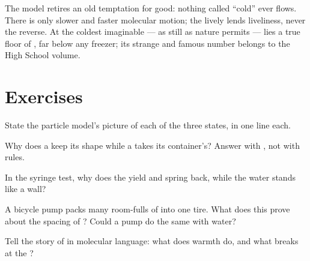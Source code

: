 \begin{example}\label{ex:g7:states-of-matter:cold}
The model retires an old temptation for good: nothing called
``cold'' ever flows. There is only slower and faster molecular
motion; the lively lends liveliness, never the reverse. At the
coldest imaginable ---  as still as nature permits ---
lies a true floor of , far below any freezer; its
strange and famous number belongs to the High School volume.
\end{example}

\section{Exercises}

\begin{exercise}[$\star$]\label{exo:g7:states-of-matter:1}
State the particle model's picture of each of the three states,
in one line each.
\end{exercise}

\begin{exercise}[$\star$]\label{exo:g7:states-of-matter:2}
Why does a  keep its shape while a  takes its
container's? Answer with , not with rules.
\end{exercise}

\begin{exercise}[$\star$]\label{exo:g7:states-of-matter:3}
In the syringe test, why does the  yield and spring back,
while the water stands like a wall?
\end{exercise}

\begin{exercise}[$\star$]\label{exo:g7:states-of-matter:4}
A bicycle pump packs many room-fulls of  into one tire. What
does this prove about the spacing of  ? Could a pump
do the same with water?
\end{exercise}

\begin{exercise}[$\star$]\label{exo:g7:states-of-matter:5}
Tell the story of  in molecular language: what does warmth
do, and what breaks at the ?
\end{exercise}

